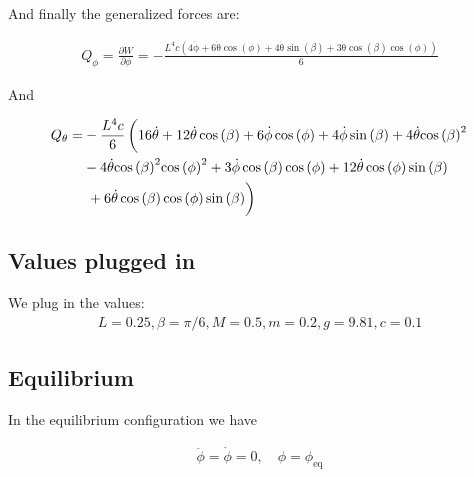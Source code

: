 And finally the generalized forces are:

\begin{equation}
    \begin{split}
        Q_\phi = \frac{\partial W}{\partial \phi} = -\frac{L^4c\left(4\mathrm{\dot\phi}+6\mathrm{\dot\theta}\cos\left(\phi \right)+4\mathrm{\dot\theta}\sin\left(\beta \right)+3\mathrm{\dot\theta}\cos\left(\beta \right)\cos\left(\phi \right)\right)}{6}
    \end{split}
\end{equation}

And 

\begin{equation}
    \begin{split}
        Q_\theta = &-\frac{L^4c}{6}\left(\vphantom{\int}16\mathrm{\dot\theta}+12\mathrm{\dot\theta}\cos\left(\beta \right)+6\mathrm{\dot\phi}\cos\left(\phi \right)+4\mathrm{\dot\phi}\sin\left(\beta \right)+4\mathrm{\dot\theta}{\cos\left(\beta \right)}^2\right.\\
        &-4\mathrm{\dot\theta}{\cos\left(\beta \right)}^2{\cos\left(\phi \right)}^2+3\mathrm{\dot\phi}\cos\left(\beta \right)\cos\left(\phi \right)+12\mathrm{\dot\theta}\cos\left(\phi \right)\sin\left(\beta \right)\\
        &\left.\vphantom{\int}+6\mathrm{\dot\theta}\cos\left(\beta \right)\cos\left(\phi \right)\sin\left(\beta \right)\right)
    \end{split}
\end{equation}

\subsection{Values plugged in}
We plug in the values:
\begin{equation}
    \begin{split}
        L=0.25,\beta = \pi/6, M= 0.5, m = 0.2, g = 9.81, c = 0.1
    \end{split}
\end{equation}
\subsection{Equilibrium}
In the equilibrium configuration we have

\begin{equation}
    \begin{split}
        \ddot \phi = \dot \phi = 0, \quad \phi = \phi_\text{eq}
    \end{split}
\end{equation}


